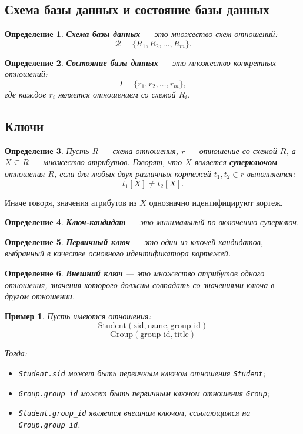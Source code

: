\documentclass[12pt,a4paper]{article}
\newtheorem{definition}{Определение}[section]
\newtheorem{example}{Пример}[section]
\theoremstyle{remark}
\begin{document}
\subsection{Схема базы данных и состояние базы данных}

\begin{definition}
\textbf{Схема базы данных} --- это множество схем отношений:
\[
\mathcal{R} = \{R_1, R_2, \dots, R_m\}.
\]
\end{definition}

\begin{definition}
\textbf{Состояние базы данных} --- это множество конкретных отношений:
\[
I = \{r_1, r_2, \dots, r_m\},
\]
где каждое $r_i$ является отношением со схемой $R_i$.
\end{definition}

\subsection{Ключи}

\begin{definition}
Пусть $R$ --- схема отношения, $r$ --- отношение со схемой $R$, а $X \subseteq R$ --- множество атрибутов. Говорят, что $X$ является \textbf{суперключом} отношения $R$, если для любых двух различных кортежей $t_1,t_2 \in r$ выполняется:
\[
t_1[X] \neq t_2[X].
\]
\end{definition}

Иначе говоря, значения атрибутов из $X$ однозначно идентифицируют кортеж.

\begin{definition}
\textbf{Ключ-кандидат} --- это минимальный по включению суперключ.
\end{definition}

\begin{definition}
\textbf{Первичный ключ} --- это один из ключей-кандидатов, выбранный в качестве основного идентификатора кортежей.
\end{definition}

\begin{definition}
\textbf{Внешний ключ} --- это множество атрибутов одного отношения, значения которого должны совпадать со значениями ключа в другом отношении.
\end{definition}

\begin{example}
Пусть имеются отношения:
\[
\text{Student}(\text{sid}, \text{name}, \text{group\_id})
\]
\[
\text{Group}(\text{group\_id}, \text{title})
\]

Тогда:
\begin{itemize}
    \item \texttt{Student.sid} может быть первичным ключом отношения \texttt{Student};
    \item \texttt{Group.group\_id} может быть первичным ключом отношения \texttt{Group};
    \item \texttt{Student.group\_id} является внешним ключом, ссылающимся на \texttt{Group.group\_id}.
\end{itemize}
\end{example}
\end{document}
